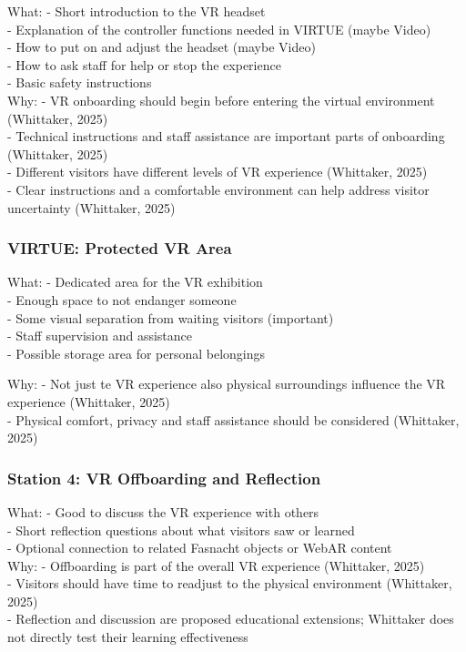 What:
- Short introduction to the VR headset
\\
- Explanation of the controller functions needed in VIRTUE (maybe Video)
\\
- How to put on and adjust the headset (maybe Video)
\\
- How to ask staff for help or stop the experience
\\
- Basic safety instructions
\\

Why:
- VR onboarding should begin before entering the virtual environment (Whittaker, 2025)
\\
- Technical instructions and staff assistance are important parts of onboarding (Whittaker, 2025)
\\
- Different visitors have different levels of VR experience (Whittaker, 2025)
\\
- Clear instructions and a comfortable environment can help address visitor uncertainty (Whittaker, 2025)


\subsubsection{VIRTUE: Protected VR Area}

What:
- Dedicated area for the VR exhibition
\\
- Enough space to not endanger someone
\\
- Some visual separation from waiting visitors (important)
\\
- Staff supervision and assistance
\\
- Possible storage area for personal belongings

Why:
- Not just te VR experience also physical surroundings influence the VR experience (Whittaker, 2025)
\\
- Physical comfort, privacy and staff assistance should be considered (Whittaker, 2025)
\\

\subsubsection{Station 4: VR Offboarding and Reflection}

What:
- Good to discuss the VR experience with others
\\
- Short reflection questions about what visitors saw or learned
\\
- Optional connection to related Fasnacht objects or WebAR content
\\
Why:
- Offboarding is part of the overall VR experience (Whittaker, 2025)
\\
- Visitors should have time to readjust to the physical environment (Whittaker, 2025)
\\
- Reflection and discussion are proposed educational extensions; Whittaker does not directly test their learning effectiveness
\\
